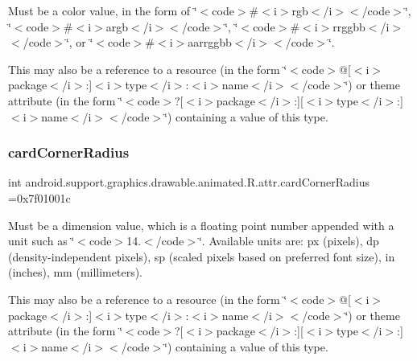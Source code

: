 Must be a color value, in the form of \char`\"{}$<$code$>$\#$<$i$>$rgb$<$/i$>$$<$/code$>$\char`\"{}, \char`\"{}$<$code$>$\#$<$i$>$argb$<$/i$>$$<$/code$>$\char`\"{}, \char`\"{}$<$code$>$\#$<$i$>$rrggbb$<$/i$>$$<$/code$>$\char`\"{}, or \char`\"{}$<$code$>$\#$<$i$>$aarrggbb$<$/i$>$$<$/code$>$\char`\"{}. 

This may also be a reference to a resource (in the form \char`\"{}$<$code$>$@\mbox{[}$<$i$>$package$<$/i$>$\+:\mbox{]}$<$i$>$type$<$/i$>$\+:$<$i$>$name$<$/i$>$$<$/code$>$\char`\"{}) or theme attribute (in the form \char`\"{}$<$code$>$?\mbox{[}$<$i$>$package$<$/i$>$\+:\mbox{]}\mbox{[}$<$i$>$type$<$/i$>$\+:\mbox{]}$<$i$>$name$<$/i$>$$<$/code$>$\char`\"{}) containing a value of this type. \mbox{\label{classandroid_1_1support_1_1graphics_1_1drawable_1_1animated_1_1R_1_1attr_a9897b4ca2973a656b743e14f96a236e2}} 
\subsubsection{\texorpdfstring{card\+Corner\+Radius}{cardCornerRadius}}
{\footnotesize\ttfamily int android.\+support.\+graphics.\+drawable.\+animated.\+R.\+attr.\+card\+Corner\+Radius =0x7f01001c\hspace{0.3cm}{\ttfamily [static]}}

Must be a dimension value, which is a floating point number appended with a unit such as \char`\"{}$<$code$>$14.\+5sp$<$/code$>$\char`\"{}. Available units are\+: px (pixels), dp (density-\/independent pixels), sp (scaled pixels based on preferred font size), in (inches), mm (millimeters). 

This may also be a reference to a resource (in the form \char`\"{}$<$code$>$@\mbox{[}$<$i$>$package$<$/i$>$\+:\mbox{]}$<$i$>$type$<$/i$>$\+:$<$i$>$name$<$/i$>$$<$/code$>$\char`\"{}) or theme attribute (in the form \char`\"{}$<$code$>$?\mbox{[}$<$i$>$package$<$/i$>$\+:\mbox{]}\mbox{[}$<$i$>$type$<$/i$>$\+:\mbox{]}$<$i$>$name$<$/i$>$$<$/code$>$\char`\"{}) containing a value of this type. \mbox{\label{classandroid_1_1support_1_1graphics_1_1drawable_1_1animated_1_1R_1_1attr_af07d688429dc272f8356b80331ab87a1}} 
